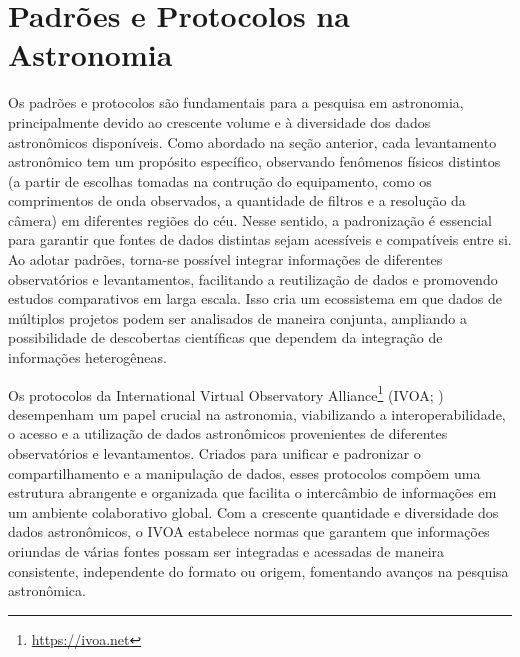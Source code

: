 













\section{Padrões e Protocolos na Astronomia}
\label{sec:protocolos}

Os padrões e protocolos são fundamentais para a pesquisa em astronomia, principalmente devido ao crescente volume e à diversidade dos dados astronômicos disponíveis. Como abordado na seção anterior, cada levantamento astronômico tem um propósito específico, observando fenômenos físicos distintos (a partir de escolhas tomadas na contrução do equipamento, como os comprimentos de onda observados, a quantidade de filtros e a resolução da câmera) em diferentes regiões do céu. Nesse sentido, a padronização é essencial para garantir que  fontes de dados distintas sejam acessíveis e compatíveis entre si. Ao adotar padrões, torna-se possível integrar informações de diferentes observatórios e levantamentos, facilitando a reutilização de dados e promovendo estudos comparativos em larga escala. Isso cria um ecossistema em que dados de múltiplos projetos podem ser analisados de maneira conjunta, ampliando a possibilidade de descobertas científicas que dependem da integração de informações heterogêneas.

Os protocolos da International Virtual Observatory Alliance\footnote{\url{https://ivoa.net}} (IVOA; \citealp{ivoa}) desempenham um papel crucial na astronomia, viabilizando a interoperabilidade, o acesso e a utilização de dados astronômicos provenientes de diferentes observatórios e levantamentos. Criados para unificar e padronizar o compartilhamento e a manipulação de dados, esses protocolos compõem uma estrutura abrangente e organizada que facilita o intercâmbio de informações em um ambiente colaborativo global. Com a crescente quantidade e diversidade dos dados astronômicos, o IVOA estabelece normas que garantem que informações oriundas de várias fontes possam ser integradas e acessadas de maneira consistente, independente do formato ou origem, fomentando avanços na pesquisa astronômica.

